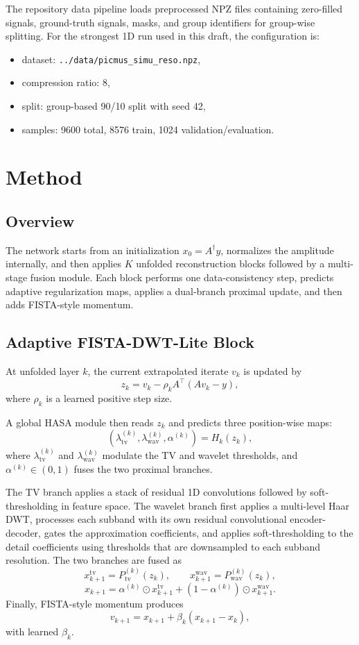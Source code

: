 \documentclass{article}
\begin{document}
The repository data pipeline loads preprocessed NPZ files containing zero-filled signals, ground-truth signals, masks, and group identifiers for group-wise splitting. For the strongest 1D run used in this draft, the configuration is:
\begin{itemize}[leftmargin=*, noitemsep]
  \item dataset: \texttt{../data/picmus\_simu\_reso.npz},
  \item compression ratio: 8,
  \item split: group-based 90/10 split with seed 42,
  \item samples: 9600 total, 8576 train, 1024 validation/evaluation.
\end{itemize}

\section{Method}
\subsection{Overview}
The network starts from an initialization $x_0 = A^\dagger y$, normalizes the amplitude internally, and then applies $K$ unfolded reconstruction blocks followed by a multi-stage fusion module. Each block performs one data-consistency step, predicts adaptive regularization maps, applies a dual-branch proximal update, and then adds FISTA-style momentum.

\subsection{Adaptive FISTA-DWT-Lite Block}
At unfolded layer $k$, the current extrapolated iterate $v_k$ is updated by
\[
z_k = v_k - \rho_k A^\top (A v_k - y),
\]
where $\rho_k$ is a learned positive step size.

A global HASA module then reads $z_k$ and predicts three position-wise maps:
\[
(\lambda^{(k)}_{\mathrm{tv}}, \lambda^{(k)}_{\mathrm{wav}}, \alpha^{(k)}) = H_k(z_k),
\]
where $\lambda^{(k)}_{\mathrm{tv}}$ and $\lambda^{(k)}_{\mathrm{wav}}$ modulate the TV and wavelet thresholds, and $\alpha^{(k)} \in (0,1)$ fuses the two proximal branches.

The TV branch applies a stack of residual 1D convolutions followed by soft-thresholding in feature space. The wavelet branch first applies a multi-level Haar DWT, processes each subband with its own residual convolutional encoder-decoder, gates the approximation coefficients, and applies soft-thresholding to the detail coefficients using thresholds that are downsampled to each subband resolution. The two branches are fused as
\[
x^{\mathrm{tv}}_{k+1} = P^{(k)}_{\mathrm{tv}}(z_k), \qquad
x^{\mathrm{wav}}_{k+1} = P^{(k)}_{\mathrm{wav}}(z_k),
\]
\[
x_{k+1} = \alpha^{(k)} \odot x^{\mathrm{tv}}_{k+1}
+ \left(1 - \alpha^{(k)}\right) \odot x^{\mathrm{wav}}_{k+1}.
\]
Finally, FISTA-style momentum produces
\[
v_{k+1} = x_{k+1} + \beta_k (x_{k+1} - x_k),
\]
with learned $\beta_k$.
\end{document}

